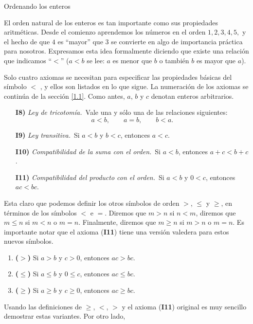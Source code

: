 \begin{section}{Ordenando los enteros}\label{1.2}

El orden natural de los enteros es tan importante como sus propiedades aritméticas. Desde el comienzo aprendemos los números en el orden $1, 2, 3, 4, 5,$ y el hecho de que $4$ es ``mayor'' que $3$ se convierte en algo de importancia práctica para nosotros. Expresamos esta idea formalmente diciendo que existe una relación que indicamos ``$<$'' ($a < b$ se lee: $a$ es menor que $b$ o también $b$ es mayor que $a$). 

Solo cuatro axiomas se necesitan para especificar las propiedades básicas del símbolo $<$ , y ellos son listados en lo que sigue. La numeración de los axiomas se continúa de la sección \ref{1.1}. Como antes, $a$, $b$ y $c$ denotan enteros arbitrarios.

\begin{enumerate}
\item[\textbf{I8)}] {\em Ley de tricotomía.}\, Vale una y sólo una de las relaciones
siguientes:
$$
a<b, \qquad a = b, \qquad b < a.
$$
\item[\textbf{I9)}] {\em Ley transitiva.}\, Si $a< b$ y $b < c$, entonces $a<c$.
\item[\textbf{I10)}] {\em Compatibilidad de la suma con el orden.}\, Si $a < b$, entonces $a+c < b+c$. 
\item[\textbf{I11)}] {\em Compatibilidad del producto con el orden.}\, Si $a< b$ y $0< c$, entonces $ac < bc$. 
\end{enumerate}


Esta claro que podemos definir los otros símbolos de orden $>$, $\le$ y $\ge$, en términos de los símbolos $<$ e $=$. Diremos que $m>n$ si  $n<m$, diremos que $m \le n$ si $m<n$ o $m=n$. Finalmente, diremos que $m \ge n$ si $m > n$ o $m=n$.  Es importante notar que el  axioma (\textbf{I11}) tiene una versión valedera para estos nuevos símbolos.
\begin{enumerate}[label=\textit{\alph*)}]
\item \textbf{($>$)} Si $a > b$ y $c>0$, entonces $ac > bc$.
\item \textbf{($\le$)} Si $a \le b$ y $0 \le c$, entonces $ac \le bc$.
\item \textbf{($\ge$)} Si $a\ge b$ y $c\ge 0$, entonces $ac \ge bc$.
\end{enumerate}
Usando las definiciones de $\ge$, $<$, $>$ y el axioma (\textbf{I11}) original es muy sencillo demostrar estas variantes. Por otro lado,


\end{section}
